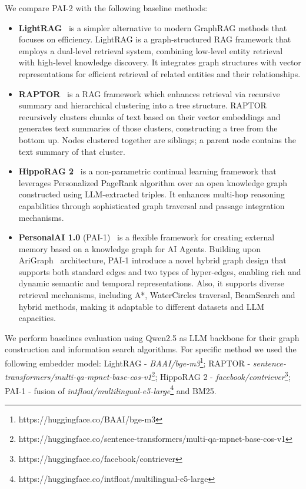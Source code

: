 We compare PAI-2 with the following baseline methods:
\begin{itemize}
    \item \textbf{LightRAG}~\cite{guo-etal-2025-lightrag} is a simpler alternative to modern GraphRAG methods that focuses on efficiency. LightRAG is a graph-structured RAG framework that employs a dual-level retrieval system, combining low-level entity retrieval with high-level knowledge discovery. It integrates graph structures with vector representations for efficient retrieval of related entities and their relationships.
    \item \textbf{RAPTOR}~\cite{sarthi2024raptor} is a RAG framework which enhances retrieval via recursive summary and hierarchical clustering into a tree structure. RAPTOR recursively clusters chunks of text based on their vector embeddings and generates text summaries of those clusters, constructing a tree from the bottom up. Nodes clustered together are siblings; a parent node contains the text summary of that cluster.
    \item \textbf{HippoRAG 2}~\cite{gutiérrez2025ragmemorynonparametriccontinual} is a non-parametric continual learning framework that leverages Personalized PageRank algorithm over an open knowledge graph constructed using LLM-extracted triples. It enhances multi-hop reasoning capabilities through sophisticated graph traversal and passage integration mechanisms.
    \item \textbf{PersonalAI 1.0} (PAI-1)~\cite{11479299} is a flexible framework for creating external memory based on a knowledge graph for AI Agents. Building upon AriGraph~\cite{anokhin2024arigraphlearningknowledgegraph} architecture, PAI-1 introduce a novel hybrid graph design that supports both standard edges and two types of hyper-edges, enabling rich and dynamic semantic and temporal representations. Also, it supports diverse retrieval mechanisms, including A*, WaterCircles traversal, BeamSearch and hybrid methods, making it adaptable to different datasets and LLM capacities. 
\end{itemize}

We perform baselines evaluation using Qwen2.5 as LLM backbone for their graph construction and information search algorithms. For specific method we used the following embedder model: LightRAG - \textit{BAAI/bge-m3}\footnote{https://huggingface.co/BAAI/bge-m3}; RAPTOR - \textit{sentence-transformers/multi-qa-mpnet-base-cos-v1}\footnote{https://huggingface.co/sentence-transformers/multi-qa-mpnet-base-cos-v1}; HippoRAG 2 - \textit{facebook/contriever}\footnote{https://huggingface.co/facebook/contriever}; PAI-1 - fusion of \textit{intfloat/multilingual-e5-large}\footnote{https://huggingface.co/intfloat/multilingual-e5-large} and BM25.